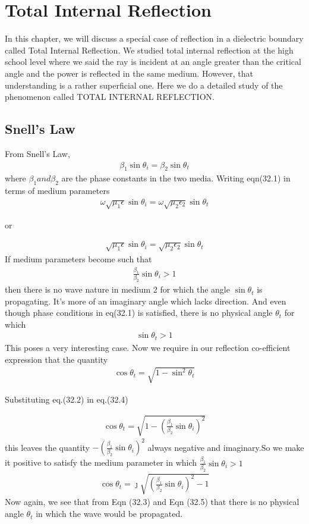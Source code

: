 \chapter{Total Internal Reflection}\label{lec:lec32}

In this chapter, we will discuss a special case of reflection in a dielectric boundary called Total Internal Reflection. We studied total internal reflection at the high school level where we said the ray is incident at an angle greater than the critical angle and the power is reflected in the same medium. However, that understanding is a rather superficial one. Here we do a detailed study of the phenomenon called TOTAL INTERNAL REFLECTION.

\section{Snell's Law}
From Snell's Law,
\begin{align}
\beta_1 \sin\theta_i = \beta_2 \sin\theta_t
\end{align}
where $\beta_1 and \beta_2$ are the phase constants in the two media. Writing eqn(32.1) in terms of medium parameters
\begin{align*}
\omega\sqrt{\mu_1\epsilon} \sin\theta_i = \omega\sqrt{\mu_2\epsilon_2}  \sin\theta_t
\end{align*}
\begin{center}
or
\end{center}
\begin{align*}
\sqrt{\mu_1\epsilon} \sin\theta_i = \sqrt{\mu_2\epsilon_2}  \sin\theta_t
\end{align*}
If medium parameters become such that
\begin{align}
\frac{\beta_1}{\beta_2}\sin\theta_i > 1
\end{align}then there is no wave nature in medium 2 for which the angle $\sin\theta_t$ is propagating. It's more of an imaginary angle which lacks direction.
And even though phase conditions in eq(32.1) is satisfied, there is no physical angle $\theta_t$ for which
\begin{align}
\sin\theta_t > 1
\end{align}
This poses a very interesting case. Now we require in our reflection co-efficient expression that the quantity
\begin{align}
\cos\theta_t = \sqrt{1-\sin^2\theta_t}
\end{align}
\begin{center}
Substituting eq.(32.2) in eq.(32.4)
\end{center}
\begin{align*}
\cos\theta_t = \sqrt{1-(\frac{\beta_1}{\beta_2}\sin\theta_i)^2}
\end{align*}
this leaves the quantity $-(\frac{\beta_1}{\beta_2}\sin\theta_i)^2$ always negative and imaginary.So we make it positive to satisfy the medium parameter in which $\frac{\beta_1}{\beta_2}\sin\theta_i > 1$
\begin{align}
\cos\theta_t = \jmath\sqrt{(\frac{\beta_1}{\beta_2}\sin\theta_i)^2-1}
\end{align}
Now again, we see that from Eqn (32.3) and Eqn (32.5) 
that there is no physical angle $\theta_t$ in which the wave would be propagated.


